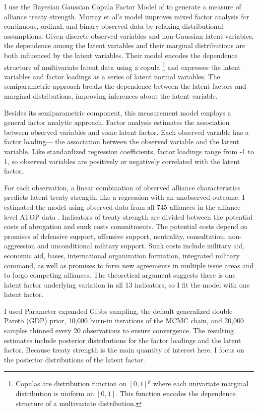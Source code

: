 \documentclass[12pt]{article}
\begin{document}
I use the Bayesian Gaussian Copula Factor Model of \citet{Murrayetal2013} to generate a measure of alliance treaty strength. 
Murray et al's model improves mixed factor analysis for continuous, ordinal, and binary observed data by relaxing distributional assumptions. 
Given discrete observed variables and non-Gaussian latent variables, the dependence among the latent variables and their marginal distributions are both influenced by the latent variables.
Their model encodes the dependence structure of multivariate latent data using a copula
\footnote{Copulas are distribution function on $[0, 1]^p$ where each univariate marginal distribution is uniform on $[0,1]$. This function encodes the dependence structure of a multivariate distribution.} 
and expresses the latent variables and factor loadings as a series of latent normal variables. 
The semiparametric approach breaks the dependence between the latent factors and marginal distributions, improving inferences about the latent variable. 


Besides its semiparametric component, this measurement model employs a general factor analytic approach.
Factor analysis estimates the association between observed variables and some latent factor.
Each observed variable has a factor loading--- the association between the observed variable and the latent variable.  
Like standardized regression coefficients, factor loadings range from -1 to 1, so observed variables are positively or negatively correlated with the latent factor.  


For each observation, a linear combination of observed alliance characteristics predicts latent treaty strength, like a regression with an unobserved outcome.  
I estimated the model using observed data from all 745 alliances in the alliance-level ATOP data \citep{Leedsetal2002}. 
Indicators of treaty strength are divided between the potential costs of abrogation and sunk costs commitments.
The potential costs depend on promises of defensive support, offensive support, neutrality, consultation, non-aggression and unconditional military support. 
Sunk costs include military aid, economic aid, bases, international organization formation, integrated military command, as well as promises to form new agreements in multiple issue areas and to forgo competing alliances. 
The theoretical argument suggests there is one latent factor underlying variation in all 13 indicators, so I fit the model with one latent factor. 


I used Parameter expanded Gibbs sampling, the default generalized double Pareto (GDP) prior, 10,000 burn-in iterations of the MCMC chain, and 20,000 samples thinned every 20 observations to ensure convergence. 
The resulting estimates include posterior distributions for the factor loadings and the latent factor. 
Because treaty strength is the main quantity of interest here, I focus on the posterior distributions of the latent factor. 
\end{document}
